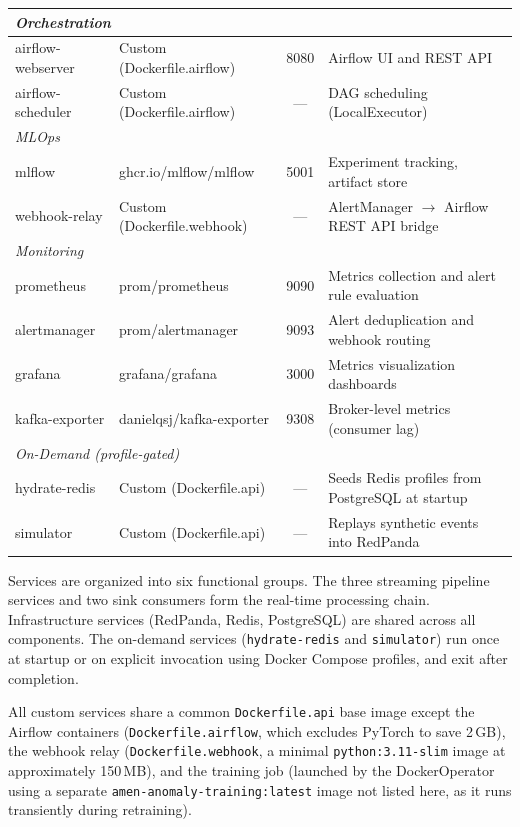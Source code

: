 \begin{longtable}{@{}llcp{5cm}@{}}
\multicolumn{4}{l}{\textit{Orchestration}} \\
\midrule
airflow-webserver  & Custom (Dockerfile.airflow) & 8080  & Airflow UI and REST API \\
airflow-scheduler  & Custom (Dockerfile.airflow) & ---   & DAG scheduling (LocalExecutor) \\
\midrule

\multicolumn{4}{l}{\textit{MLOps}} \\
\midrule
mlflow             & ghcr.io/mlflow/mlflow   & 5001  & Experiment tracking, artifact store \\
webhook-relay      & Custom (Dockerfile.webhook) & ---  & AlertManager $\rightarrow$ Airflow REST API bridge \\
\midrule

\multicolumn{4}{l}{\textit{Monitoring}} \\
\midrule
prometheus         & prom/prometheus          & 9090  & Metrics collection and alert rule evaluation \\
alertmanager       & prom/alertmanager        & 9093  & Alert deduplication and webhook routing \\
grafana            & grafana/grafana          & 3000  & Metrics visualization dashboards \\
kafka-exporter     & danielqsj/kafka-exporter & 9308  & Broker-level metrics (consumer lag) \\
\midrule

\multicolumn{4}{l}{\textit{On-Demand (profile-gated)}} \\
\midrule
hydrate-redis      & Custom (Dockerfile.api) & ---   & Seeds Redis profiles from PostgreSQL at startup \\
simulator          & Custom (Dockerfile.api) & ---   & Replays synthetic events into RedPanda \\

\end{longtable}

Services are organized into six functional groups. The three streaming
pipeline services and two sink consumers form the real-time processing
chain. Infrastructure services (RedPanda, Redis, PostgreSQL) are shared
across all components. The on-demand services (\texttt{hydrate-redis}
and \texttt{simulator}) run once at startup or on explicit invocation
using Docker Compose profiles, and exit after completion.

All custom services share a common \texttt{Dockerfile.api} base image
except the Airflow containers (\texttt{Dockerfile.airflow}, which
excludes PyTorch to save 2\,GB), the webhook relay
(\texttt{Dockerfile.webhook}, a minimal \texttt{python:3.11-slim} image
at approximately 150\,MB), and the training job (launched by the
DockerOperator using a separate \texttt{amen-anomaly-training:latest}
image not listed here, as it runs transiently during retraining).